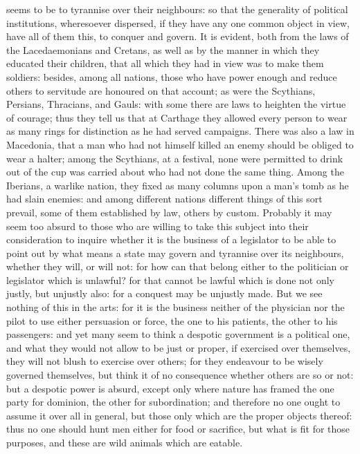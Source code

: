 seems to be to tyrannise over their neighbours: so that the generality of
political institutions, wheresoever dispersed, if they have any one common
object in view, have all of them this, to conquer and govern. It is
evident, both from the laws of the Lacedaemonians and Cretans, as well as
by the manner in which they educated their children, that all which they
had in view was to make them soldiers: besides, among all nations, those
who have power enough and reduce others to servitude are honoured on that
account; as were the Scythians, Persians, Thracians, and Gauls: with some
there are laws to heighten the virtue of courage; thus they tell us that
at Carthage they allowed every person to wear as many rings for
distinction as he had served campaigns. There was also a law in Macedonia,
that a man who had not himself killed an enemy should be obliged to wear a
halter; among the Scythians, at a festival, none were permitted to drink
out of the cup was carried about who had not done the same thing. Among
the Iberians, a warlike nation, they fixed as many columns upon a man's
tomb as he had slain enemies: and among different nations different things
of this sort prevail, some of them established by law, others by custom.
Probably it may seem too absurd to those who are willing to take this
subject into their consideration to inquire whether it is the business of
a legislator to be able to point out by what means a state may govern and
tyrannise over its neighbours, whether they will, or will not: for how can
that belong either to the politician or legislator which is unlawful? for
that cannot be lawful which is done not only justly, but unjustly also:
for a conquest may be unjustly made. But we see nothing of this in the
arts: for it is the business neither of the physician nor the pilot to use
either persuasion or force, the one to his patients, the other to his
passengers: and yet many seem to think a despotic government is a
political one, and what they would not allow to be just or proper, if
exercised over themselves, they will not blush to exercise over others;
for they endeavour to be wisely governed themselves, but think it of no
consequence whether others are so or not: but a despotic power is absurd,
except only where nature has framed the one party for dominion, the other
for subordination; and therefore no one ought to assume it over all in
general, but those only which are the proper objects thereof: thus no one
should hunt men either for food or sacrifice, but what is fit for those
purposes, and these are wild animals which are eatable.

